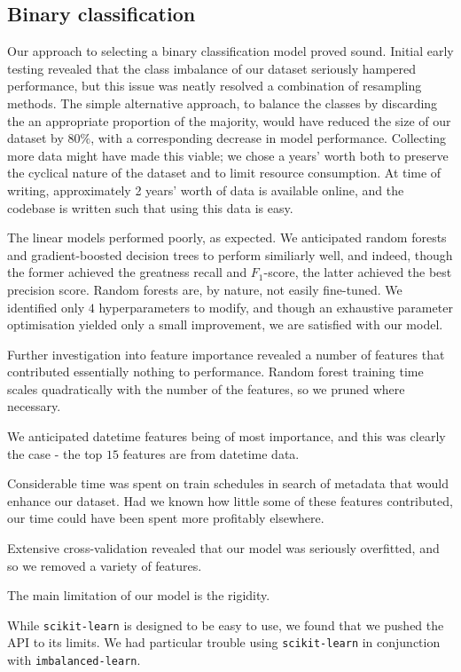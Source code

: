 \documentclass[12pt,a4paper]{article}
\begin{document}
\subsection{Binary classification}

Our approach to selecting a binary classification model proved sound. Initial early testing revealed that the class imbalance of our dataset seriously hampered performance, but this issue was neatly resolved a combination of resampling methods. The simple alternative approach, to balance the classes by discarding the an appropriate proportion of the majority, would have reduced the size of our dataset by $80\%$, with a corresponding decrease in model performance. Collecting more data might have made this viable; we chose a years' worth both to preserve the cyclical nature of the dataset and to limit resource consumption. At time of writing, approximately 2 years' worth of data is available online, and the codebase is written such that using this data is easy. 

The linear models performed poorly, as expected. We anticipated random forests and gradient-boosted decision trees to perform similiarly well, and indeed, though the former achieved the greatness recall and $F_1$-score, the latter achieved the best precision score. Random forests are, by nature, not easily fine-tuned. We identified only $4$ hyperparameters to modify, and though an exhaustive parameter optimisation yielded only a small improvement, we are satisfied with our model. 

Further investigation into feature importance revealed a number of features that contributed essentially nothing to performance. Random forest training time scales quadratically with the number of the features, so we pruned where necessary.

We anticipated datetime features being of most importance, and this was clearly the case - the top $15$ features are from datetime data. 

Considerable time was spent on train schedules in search of metadata that would enhance our dataset. Had we known how little some of these features contributed, our time could have been spent more profitably elsewhere. 

Extensive cross-validation revealed that our model was seriously overfitted, and so we removed a variety of features.

The main limitation of our model is the rigidity. 

While \verb|scikit-learn| is designed to be easy to use, we found that we pushed the API to its limits. We had particular trouble using \verb|scikit-learn| in conjunction with \verb|imbalanced-learn|.
\end{document}
